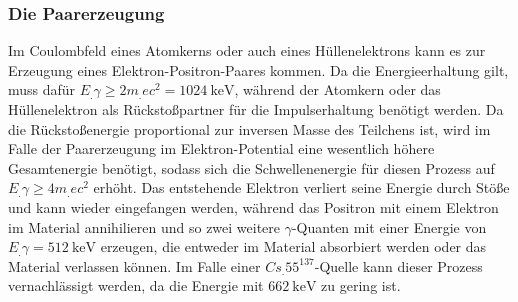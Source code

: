 \subsubsection{Die Paarerzeugung}

Im Coulombfeld eines Atomkerns oder auch eines Hüllenelektrons kann es zur Erzeugung eines Elektron-Positron-Paares kommen. Da die Energieerhaltung gilt, muss dafür $E_.{\gamma} \geq 2m_.ec^2 = \SI{1024}{\kilo\eV}$, während der Atomkern oder das Hüllenelektron als Rückstoßpartner für die Impulserhaltung benötigt werden. Da die Rückstoßenergie proportional zur inversen Masse des Teilchens ist, wird im Falle der Paarerzeugung im Elektron-Potential eine wesentlich höhere Gesamtenergie benötigt, sodass sich die Schwellenenergie für diesen Prozess auf $E_.{\gamma} \geq 4m_.ec^2$ erhöht. Das entstehende Elektron verliert seine Energie durch Stöße und kann wieder eingefangen werden, während das Positron mit einem Elektron im Material annihilieren und so zwei weitere $\gamma$-Quanten mit einer Energie von $E_.{\gamma}=\SI{512}{\kilo\eV}$ erzeugen, die entweder im Material absorbiert werden oder das Material verlassen können. 
Im Falle einer $Cs_.{55}^\text{137}$-Quelle kann dieser Prozess vernachlässigt werden, da die Energie mit $\SI{662}{\kilo\eV}$ zu gering ist.

